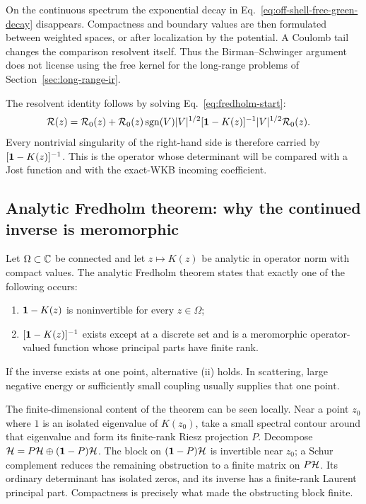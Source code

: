 On the continuous spectrum the exponential decay in
Eq.~\eqref{eq:off-shell-free-green-decay} disappears.  Compactness and
boundary values are then formulated between weighted spaces, or after
localization by the potential.  A Coulomb tail changes the comparison
resolvent itself.  Thus the Birman--Schwinger argument does not license using
the free kernel for the long-range problems of
Section~\ref{sec:long-range-ir}.

The resolvent identity follows by solving Eq.~\eqref{eq:fredholm-start}:
\begin{align}
  \mathcal{R}(z)
  &=\mathcal{R}_0(z)
  +\mathcal{R}_0(z)\operatorname{sgn}(V)|V|^{1/2}
  [\mathbf{1}-K(z)]^{-1}
  |V|^{1/2}\mathcal{R}_0(z).
  \label{eq:bs-resolvent-formula}
\end{align}
Every nontrivial singularity of the right-hand side is therefore carried by
$[\mathbf{1}-K(z)]^{-1}$.  This is the operator whose determinant will be
compared with a Jost function and with the exact-WKB incoming coefficient.

\subsection{Analytic Fredholm theorem: why the continued inverse is meromorphic}
\label{subsec:analytic-fredholm}

Let $\Omega\subset\mathbb{C}$ be connected and let
$z\mapsto K(z)$ be analytic in operator norm with compact values.  The
analytic Fredholm theorem states that exactly one of the following occurs:
\begin{enumerate}[label=(\roman*)]
  \item $\mathbf{1}-K(z)$ is noninvertible for every $z\in\Omega$;
  \item $[\mathbf{1}-K(z)]^{-1}$ exists except at a discrete set and is a
  meromorphic operator-valued function whose principal parts have finite
  rank.
\end{enumerate}
If the inverse exists at one point, alternative (ii) holds.  In scattering,
large negative energy or sufficiently small coupling usually supplies that
one point.

The finite-dimensional content of the theorem can be seen locally.  Near a
point $z_0$ where $1$ is an isolated eigenvalue of $K(z_0)$, take a small
spectral contour around that eigenvalue and form its finite-rank Riesz
projection $P$.  Decompose $\mathcal{H}=P\mathcal{H}\oplus(\mathbf{1}-P)\mathcal{H}$.  The block on
$(\mathbf{1}-P)\mathcal{H}$ is invertible near $z_0$; a Schur complement reduces the
remaining obstruction to a finite matrix on $P\mathcal{H}$.  Its ordinary
determinant has isolated zeros, and its inverse has a finite-rank Laurent
principal part.  Compactness is precisely what made the obstructing block
finite.

